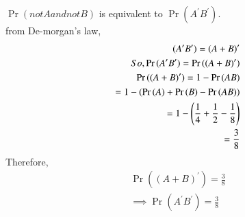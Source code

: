 $\Pr{(not A and not B)}$ is equivalent to $\Pr{(A^\prime B^\prime)}$.\\
from De-morgan's law,\\
\begin{align}
    (A^\prime B^\prime)=(A+B)^\prime\\
    So, \Pr{(A^\prime B^\prime)}=\Pr{((A+B)^\prime)}\\
  \Pr{((A+B)^\prime)}=1-\Pr{(AB)}\\
  =1-(\Pr{(A)}+\Pr{(B)}-\Pr{(AB)})\\
  =1-\left(\frac{1}{4} +\frac{1}{2} -\frac{1}{8}\right)\\
  =\frac{3}{8}\\
  \end{align}
  Therefore,\\
 \begin{align}
  \Pr{((A+B)^\prime)}=\frac{3}{8}\\
  \implies \Pr{(A^\prime B^\prime)}=\frac{3}{8}\\
  \end{align}